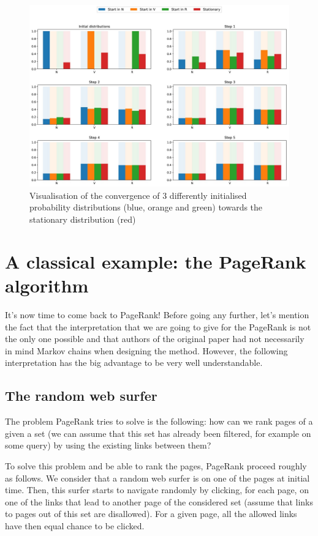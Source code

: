 \begin{figure}[h]
    \centering
\includegraphics[width=\textwidth]{pic/p05c07-snip09.png}
    \caption[Visualisation of convergence of probability distributions]{Visualisation of the convergence of 3 differently initialised probability distributions (blue, orange and green) towards the stationary distribution (red)}
    \label{fig:p05c07-snip09}
\end{figure}




\section{A classical example: the PageRank algorithm}

It's now time to come back to PageRank! Before going any further, let's mention the fact that the interpretation that we are going to give for the PageRank is not the only one possible and that authors of the original paper had not necessarily in mind Markov chains when designing the method. However, the following interpretation has the big advantage to be very well understandable.

\subsection{The random web surfer}

The problem PageRank tries to solve is the following: how can we rank pages of a given a set (we can assume that this set has already been filtered, for example on some query) by using the existing links between them?

To solve this problem and be able to rank the pages, PageRank proceed roughly as follows. We consider that a random web surfer is on one of the pages at initial time. Then, this surfer starts to navigate randomly by clicking, for each page, on one of the links that lead to another page of the considered set (assume that links to pages out of this set are disallowed). For a given page, all the allowed links have then equal chance to be clicked.

